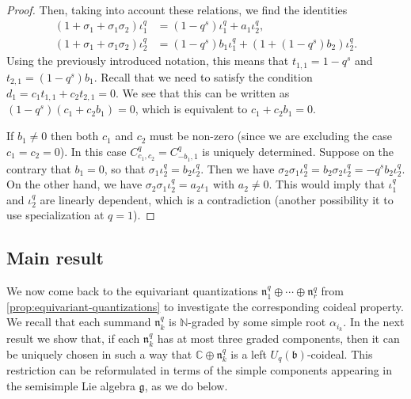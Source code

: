 \documentclass[a4paper, 12pt, reqno, english]{amsart}
\numberwithin{equation}{section}
\numberwithin{figure}{section}
\theoremstyle{plain}
\theoremstyle{plain}
\theoremstyle{plain}
\theoremstyle{plain}
\theoremstyle{plain}
\theoremstyle{definition}
\theoremstyle{definition}
\theoremstyle{definition}
\theoremstyle{remark}
\theoremstyle{definition}
\theoremstyle{definition}
\newcommand{\Uqb}{U_q(\mathfrak{b})}
\newcommand{\bbC}{\mathbb{C}}
\newcommand{\bbN}{\mathbb{N}}
\newcommand{\lieg}{\mathfrak{g}}
\newcommand{\lien}{\mathfrak{n}}
\newcommand{\qnil}{\lien^q}
\begin{document}
\begin{proof}
Then, taking into account these relations, we find the identities
\[
\begin{split}
(1 + \sigma_1 + \sigma_1 \sigma_2) \iota^q_1
& = (1 - q^s) \iota^q_1 + a_1 \iota^q_2, \\
(1 + \sigma_1 + \sigma_1 \sigma_2) \iota^q_2
& = (1 - q^s) b_1 \iota^q_1 + (1 + (1 - q^s) b_2) \iota^q_2.
\end{split}
\]
Using the previously introduced notation, this means that $t_{1, 1} = 1 - q^s$ and $t_{2, 1} = (1 - q^s) b_1$.
Recall that we need to satisfy the condition $d_1 = c_1 t_{1, 1} + c_2 t_{2, 1} = 0$.
We see that this can be written as $(1 - q^s) (c_1 + c_2 b_1) = 0$, which is equivalent to $c_1 + c_2 b_1 = 0$.

If $b_1 \neq 0$ then both $c_1$ and $c_2$ must be non-zero (since we are excluding the case $c_1 = c_2 = 0$). In this case $C^q_{c_1, c_2} = C^q_{- b_1, 1}$ is uniquely determined.
Suppose on the contrary that $b_1 = 0$, so that $\sigma_1 \iota^q_2 = b_2 \iota^q_2$. Then we have $\sigma_2 \sigma_1 \iota^q_2 = b_2 \sigma_2 \iota^q_2 = - q^s b_2 \iota^q_2$.
On the other hand, we have $\sigma_2 \sigma_1 \iota^q_2 = a_2 \iota_1$ with $a_2 \neq 0$. This would imply that $\iota^q_1$ and $\iota^q_2$ are linearly dependent, which is a contradiction (another possibility it to use specialization at $q = 1$).
\end{proof}

\subsection{Main result}

We now come back to the equivariant quantizations $\qnil_1 \oplus \cdots \oplus \qnil_r$ from \cref{prop:equivariant-quantizations} to investigate the corresponding coideal property.
We recall that each summand $\qnil_k$ is $\bbN$-graded by some simple root $\alpha_{i_k}$.
In the next result we show that, if each $\qnil_k$ has at most three graded components, then it can be uniquely chosen in such a way that $\bbC \oplus \qnil_k$ is a left $\Uqb$-coideal.
This restriction can be reformulated in terms of the simple components appearing in the semisimple Lie algebra $\lieg$, as we do below.
\end{document}
